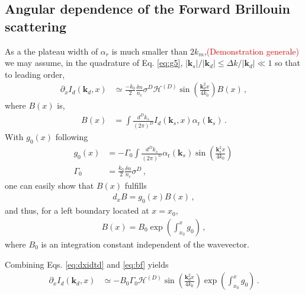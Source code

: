 \documentclass[
 reprint,
 amsmath,amssymb,
 aps,
]{revtex4-1}
\begin{document}
 \subsection{Angular dependence of the  Forward Brillouin scattering}
As a the plateau width of $\alpha_r$ is much smaller than $2k_m$,\textcolor{red}{(Demonstration generale)}  we may assume, in the quadrature of Eq. \eqref{eq:g5},   $ \vert\mathbf{k}_s \vert/\vert\mathbf{k}_d\vert \le\Delta k/ \vert\mathbf{k}_d\vert \ll 1$ so that to leading order,
\begin{align}
\partial_xI_d(\mathbf{k}_d,x)&\simeq  \frac{-k_0}{2} \frac{ \delta n}{n_c}   \sigma^D 
 \mathcal{H}^{(D)}\sin\left({\frac{ \mathbf{k}_d^2x}{4k_0}}  \right)
B(x)
\, , \label{eq:dxidtd}
\end{align}
where $B(x)$ is,
\begin{align}
B(x)&=
 \int \frac{d^Dk_s}{(2\pi)^D}    I_d(\mathbf{k}_s,x) \alpha_\mathrm{r}(\mathbf{k}_s) 
\, . \label{eq:b}
\end{align}
With $g_0(x)$ following
\begin{align}
g_0(x)&= -\Gamma_0 \int \frac{d^Dk_s}{(2\pi)^D}  \alpha_\mathrm{r}(\mathbf{k}_s) 
\sin\left(\frac{ \mathbf{k}_s^2x}{4k_0}  \right)\,  \nonumber\\
\Gamma_0&=\frac{k_0}{2}  \frac{\delta n}{n_c}
  \sigma^D \, ,
\label{eq:gain0}
\end{align}
one can easily show that $B(x)$ fulfills 
\begin{align}
d_xB = g_0(x) B(x)\, ,
\label{eq:db}
\end{align} 
and thus, for a left boundary located at $x=x_0$,
\begin{align}
B(x) = B_0\exp\left(\int_{x_0}^x g_0 \right)\, ,
\label{eq:bf}
\end{align} 
where $B_0$ is an integration constant independent of the wavevector.

Combining Eqs.  \eqref{eq:dxidtd} and \eqref{eq:bf} yields 
\begin{align}
\partial_xI_d(\mathbf{k}_d,x)&\simeq -B_0\Gamma_0
 \mathcal{H}^{(D)}\sin\left({\frac{ \mathbf{k}_d^2x}{4k_0}}  \right)
\exp\left(\int_{x_0}^x g_0 \right)
\, . \label{eq:dxidtdf}
\end{align}
\end{document}
